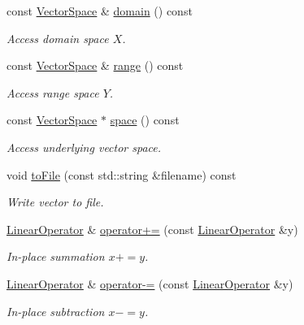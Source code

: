 \begin{DoxyCompactItemize}
\item 
const \hyperlink{classSpacy_1_1VectorSpace}{Vector\+Space} \& \hyperlink{classSpacy_1_1OperatorBase_a2588f9b3e0188820c4c494e63293dc6f_a2588f9b3e0188820c4c494e63293dc6f}{domain} () const 
\begin{DoxyCompactList}\small\item\em Access domain space $X$. \end{DoxyCompactList}\item 
const \hyperlink{classSpacy_1_1VectorSpace}{Vector\+Space} \& \hyperlink{classSpacy_1_1OperatorBase_ab19d3b7a6f290b1079248f1e567e53d6_ab19d3b7a6f290b1079248f1e567e53d6}{range} () const 
\begin{DoxyCompactList}\small\item\em Access range space $Y$. \end{DoxyCompactList}\item 
const \hyperlink{classSpacy_1_1VectorSpace}{Vector\+Space} $\ast$ \hyperlink{classSpacy_1_1VectorBase_a95e87ce98f5a7646055d4e87e6024044_a95e87ce98f5a7646055d4e87e6024044}{space} () const 
\begin{DoxyCompactList}\small\item\em Access underlying vector space. \end{DoxyCompactList}\item 
void \hyperlink{classSpacy_1_1VectorBase_afb1386a51c713d85ea2fc7a2cb41d04e_afb1386a51c713d85ea2fc7a2cb41d04e}{to\+File} (const std\+::string \&filename) const 
\begin{DoxyCompactList}\small\item\em Write vector to file. \end{DoxyCompactList}\item 
\hyperlink{classSpacy_1_1FEniCS_1_1LinearOperator}{Linear\+Operator} \& \hyperlink{classSpacy_1_1SupportedOperatorBase_a9d52829c0e1fcafab1f2a3de17379633_a9d52829c0e1fcafab1f2a3de17379633}{operator+=} (const \hyperlink{classSpacy_1_1FEniCS_1_1LinearOperator}{Linear\+Operator} \&y)
\begin{DoxyCompactList}\small\item\em In-\/place summation $ x+=y$. \end{DoxyCompactList}\item 
\hyperlink{classSpacy_1_1FEniCS_1_1LinearOperator}{Linear\+Operator} \& \hyperlink{classSpacy_1_1SupportedOperatorBase_af21496412c35e4afa59779b4fe1b67d5_af21496412c35e4afa59779b4fe1b67d5}{operator-\/=} (const \hyperlink{classSpacy_1_1FEniCS_1_1LinearOperator}{Linear\+Operator} \&y)
\begin{DoxyCompactList}\small\item\em In-\/place subtraction $ x-=y$. \end{DoxyCompactList}\item 

\end{DoxyCompactItemize}
